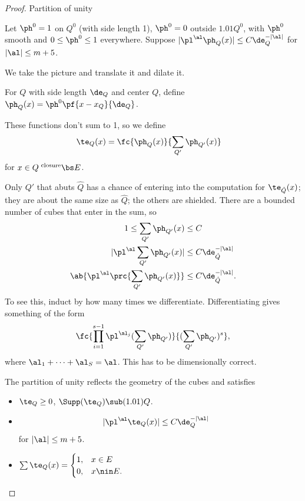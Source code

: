 \begin{proof}
 Partition of unity

Let $\ph^0=1$ on $Q^0$ (with side length 1), $\ph^0=0$ outside $1.01Q^0$, with $\ph^0$ smooth and $0\le \ph^0\le 1$ everywhere. Suppose $|\pl^\al \ph_Q(x)|\le C\de_Q^{-|\al|}$ for $|\al|\le m+5$. 

We take the picture and translate it and dilate it. 

For $Q$ with side length $\de_Q$ and center $Q$, define $\ph_Q(x) = \ph^0\pf{x-x_Q}{\de_Q}$. 

These functions don't sum to 1, so we define
\begin{align}
\te_Q(x) &= \fc{\ph_Q(x)}{\sum_{Q'}\ph_{Q'}(x)}
\end{align}
for $x\in Q^{\text{ closure}}\bs E$. 

Only $Q'$ that abuts $\hat Q$ has a chance of entering into the computation for $\te_{\hat Q}(x)$; they are about the same size as $\hat Q$; the others are shielded. There are a bounded number of cubes that enter in the sum, so 
\begin{align}
1\le \sum_{Q'} \ph_{Q'}(x) &\le C\\
|\pl^\al \sum_{Q'} \ph_{Q'}(x)| &\le C \de_{\hat Q}^{-|\al|}\\
\ab{\pl^\al \prc{\sum_{Q'} \ph_{Q'}(x)}}
&\le C\de_{\hat Q}^{-|\al|}. 
\end{align}
To see this, induct by how many times we differentiate. Differentiating gives something of the form
\begin{align}
\fc{\prod_{i=1}^{s-1} \pl^{\al_j}(\sum_{Q'} \ph_{Q'})}{(\sum_{Q'} \ph_{Q'})^s},
\end{align}
where $\al_1+\cdots + \al_S=\al$. This has to be dimensionally correct.

The partition of unity reflects the geometry of the cubes and satisfies
\begin{itemize}
\item
$\te_Q\ge 0$, $\Supp(\te_Q)\sub (1.01)Q$.
\item
\begin{align}
|\pl^\al \te_Q(x)| &\le C \de_Q^{-|\al|}
\end{align}
for $|\al|\le m+5$. 
\item
$\sum \te_Q(x) = \begin{cases}
1, &x\in E\\
0, &x\nin E.
\end{cases}$
\end{itemize}


\end{proof}
